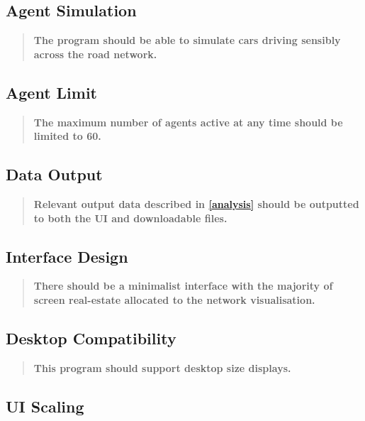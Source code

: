     \subsection{Agent Simulation}

        \begin{quote}
            \textbf{The program should be able to simulate cars driving sensibly across the road network.}
        \end{quote}

    \subsection{Agent Limit}

        \begin{quote}
            \textbf{The maximum number of agents active at any time should be limited to 60.}
        \end{quote}

    \subsection{Data Output}

        \begin{quote}
            \textbf{Relevant output data described in \autoref{analysis} should be outputted to both the UI and downloadable files.}
        \end{quote}

    \subsection{Interface Design}

        \begin{quote}
            \textbf{There should be a minimalist interface with the majority of screen real-estate allocated to the network visualisation.}
        \end{quote}

    \subsection{Desktop Compatibility}

        \begin{quote}
            \textbf{This program should support desktop size displays.}
        \end{quote}

    \subsection{UI Scaling}

